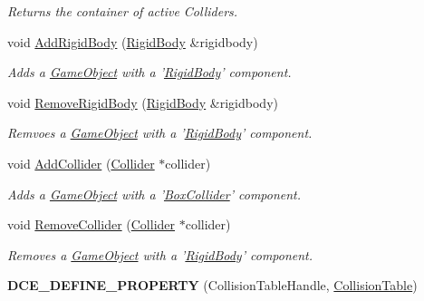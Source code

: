 \begin{DoxyCompactItemize}
\begin{DoxyCompactList}\small\item\em Returns the container of active Colliders. \end{DoxyCompactList}\item 
void \hyperlink{classDCEngine_1_1Components_1_1PhysicsSpace_af67fcaafccaa698642250dd726e708ae}{Add\-Rigid\-Body} (\hyperlink{classDCEngine_1_1Components_1_1RigidBody}{Rigid\-Body} \&rigidbody)
\begin{DoxyCompactList}\small\item\em Adds a \hyperlink{classDCEngine_1_1GameObject}{Game\-Object} with a '\hyperlink{classDCEngine_1_1Components_1_1RigidBody}{Rigid\-Body}' component. \end{DoxyCompactList}\item 
void \hyperlink{classDCEngine_1_1Components_1_1PhysicsSpace_a419e695863bc3c5c20cb19a607246ed3}{Remove\-Rigid\-Body} (\hyperlink{classDCEngine_1_1Components_1_1RigidBody}{Rigid\-Body} \&rigidbody)
\begin{DoxyCompactList}\small\item\em Remvoes a \hyperlink{classDCEngine_1_1GameObject}{Game\-Object} with a '\hyperlink{classDCEngine_1_1Components_1_1RigidBody}{Rigid\-Body}' component. \end{DoxyCompactList}\item 
void \hyperlink{classDCEngine_1_1Components_1_1PhysicsSpace_a8bcda83c46e1bc3ceeabd81aa2d1b601}{Add\-Collider} (\hyperlink{classDCEngine_1_1Components_1_1Collider}{Collider} $\ast$collider)
\begin{DoxyCompactList}\small\item\em Adds a \hyperlink{classDCEngine_1_1GameObject}{Game\-Object} with a '\hyperlink{classDCEngine_1_1Components_1_1BoxCollider}{Box\-Collider}' component. \end{DoxyCompactList}\item 
void \hyperlink{classDCEngine_1_1Components_1_1PhysicsSpace_ac796bba9a65f292f4d13c98ff5cbbc2a}{Remove\-Collider} (\hyperlink{classDCEngine_1_1Components_1_1Collider}{Collider} $\ast$collider)
\begin{DoxyCompactList}\small\item\em Removes a \hyperlink{classDCEngine_1_1GameObject}{Game\-Object} with a '\hyperlink{classDCEngine_1_1Components_1_1RigidBody}{Rigid\-Body}' component. \end{DoxyCompactList}\item 
\hypertarget{classDCEngine_1_1Components_1_1PhysicsSpace_a59a83217019dec4a8b167cabbd26ba55}{{\bfseries D\-C\-E\-\_\-\-D\-E\-F\-I\-N\-E\-\_\-\-P\-R\-O\-P\-E\-R\-T\-Y} (Collision\-Table\-Handle, \hyperlink{classDCEngine_1_1CollisionTable}{Collision\-Table})}\label{classDCEngine_1_1Components_1_1PhysicsSpace_a59a83217019dec4a8b167cabbd26ba55}


\end{DoxyCompactItemize}
